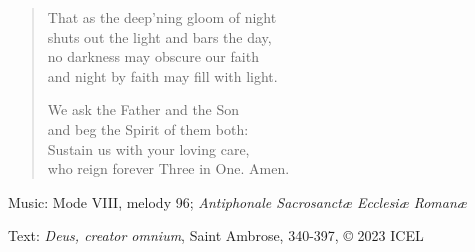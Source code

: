 \hymn



\setlength{\leftmargini}{2em}
\begin{verse}
That as the deep’ning gloom of night\\
shuts out the light and bars the day,\\
no darkness may obscure our faith\\
and night by faith may fill with light.

We ask the Father and the Son\\
and beg the Spirit of them both:\\
Sustain us with your loving care,\\
who reign forever Three in One. Amen.
\end{verse}

\begin{hymnsource}
Music: Mode VIII, melody 96; \emph{Antiphonale Sacrosanctæ Ecclesiæ Romanæ}

Text: \emph{Deus, creator omnium}, Saint Ambrose, 340-397, © 2023 ICEL
\end{hymnsource}
